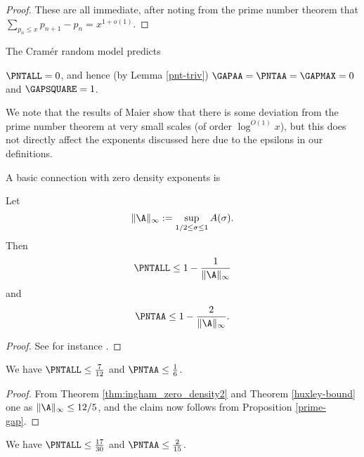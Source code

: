 \begin{proof} These are all immediate, after noting from the prime number theorem that $\sum_{p_n \leq x} p_{n+1} - p_n = x^{1+o(1)}$.
\end{proof}

The Cram\'er random model \cite{cramer} predicts

\begin{conjecture} $\PNTALL = 0$, and hence (by Lemma \ref{pnt-triv}) $\GAPAA = \PNTAA = \GAPMAX=0$ and $\GAPSQUARE=1$.
\end{conjecture}

We note that the results of Maier \cite{maier-primes} show that there is some deviation from the prime number theorem at very small scales (of order $\log^{O(1)} x$), but this does not directly affect the exponents discussed here due to the epsilons in our definitions.

A basic connection with zero density exponents is

\begin{proposition}\label{prime-gap}  Let
\begin{equation}\label{A-def}
    \|\A\|_\infty := \sup_{1/2 \leq \sigma \leq 1} A(\sigma).
\end{equation}
Then
    $$ \PNTALL \leq 1 - \frac{1}{\|\A\|_\infty}$$
    and
    $$ \PNTAA \leq 1 - \frac{2}{\|\A\|_\infty}.$$
\end{proposition}

\begin{proof} See for instance \cite[\S 13.2]{guth-maynard}.
\end{proof}

\begin{corollary}  We have $\PNTALL \leq \frac{7}{12}$ and $\PNTAA \leq \frac{1}{6}$.
\end{corollary}

\begin{proof}  From Theorem \ref{thm:ingham_zero_density2} and Theorem \ref{huxley-bound} one as $\|\A\|_\infty \leq 12/5$, and the claim now follows from Proposition \ref{prime-gap}.
\end{proof}

\begin{corollary}\cite{guth-maynard}  We have $\PNTALL \leq \frac{17}{30}$ and $\PNTAA \leq \frac{2}{15}$.
\end{corollary}

